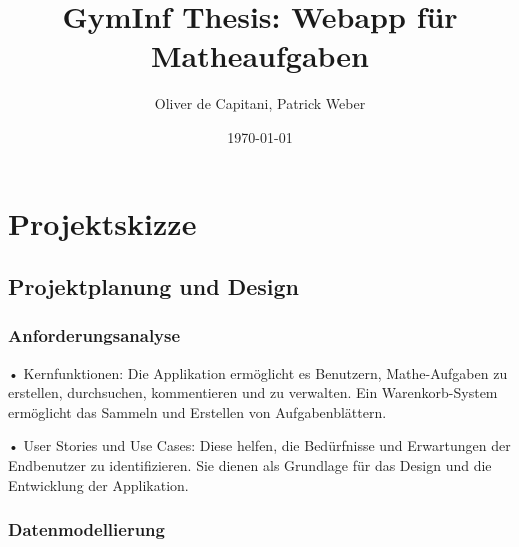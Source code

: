 \documentclass[12pt,a4paper]{article} %
\title{GymInf Thesis: Webapp für Matheaufgaben}
\date{\today}
\author{Oliver de Capitani, Patrick Weber}
\begin{document}
\maketitle %
% 











\newpage %
\tableofcontents %











\newpage


\section{Projektskizze}
\subsection{Projektplanung und Design}
\subsubsection*{Anforderungsanalyse}

•	Kernfunktionen: Die Applikation ermöglicht es Benutzern, Mathe-Aufgaben zu erstellen, durchsuchen, kommentieren und zu verwalten. 
Ein Warenkorb-System ermöglicht das Sammeln und Erstellen von Aufgabenblättern.

•	User Stories und Use Cases: Diese helfen, die Bedürfnisse und Erwartungen der Endbenutzer zu identifizieren. Sie dienen als Grundlage für das Design und die Entwicklung der Applikation.


\subsubsection*{Datenmodellierung}
\end{document}
